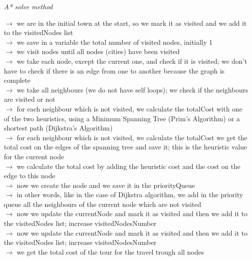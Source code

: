 \documentclass[12pt, a4paper]{article}
\begin{document}
\newpage
\centering
\large
\textit{A* solve method}

\vspace{5mm}
\begin{flushleft}
\hspace{3mm}$\rightarrow$ we are in the initial town at the start, so we mark it as visited and we add it to the visitedNodes list\\
\hspace{3mm}$\rightarrow$ we save in a variable the total number of visited nodes, initially 1\\
\hspace{3mm}$\rightarrow$ we visit nodes until all nodes (cities) have been visited\\
\hspace{3mm}$\rightarrow$ we take each node, except the current one, and check if it is visited; we don't have to check if there is an edge from one to another because the graph is complete\\
\hspace{3mm}$\rightarrow$ we take all neighbours (we do not have self loops); we check if the neighbours are visited or not\\
\hspace{3mm}$\rightarrow$ for each neighbour which is not visited, we calculate the totalCost with one of the two heuristics, using a Minimum Spanning Tree (Prim's Algorithm) or a shortest path (Dijkstra's Algorithm)\\
\hspace{3mm}$\rightarrow$ for each neighbour which is not visited, we calculate the totalCost we get the total cost on the edges of the spanning tree and save it; this is the heuristic value for the current node\\
\hspace{3mm}$\rightarrow$ we calculate the total cost by adding the heuristic cost and the cost on the edge to this node\\
\hspace{3mm}$\rightarrow$ now we create the node and we save it in the priorityQueue\\
\hspace{3mm}$\rightarrow$ in other words, like in the case of Dijkstra algorithm, we add in the priority queue all the neighbours of the current node which are not visited\\
\hspace{3mm}$\rightarrow$ now we update the currentNode and mark it as visited and then we add it to the visitedNodes list; increase visitedNodesNumber\\
\hspace{3mm}$\rightarrow$ now we update the currentNode and mark it as visited and then we add it to the visitedNodes list; increase visitedNodesNumber\\
\hspace{3mm}$\rightarrow$ we get the total cost of the tour for the travel trough all nodes\\
\end{flushleft}
\end{document}
